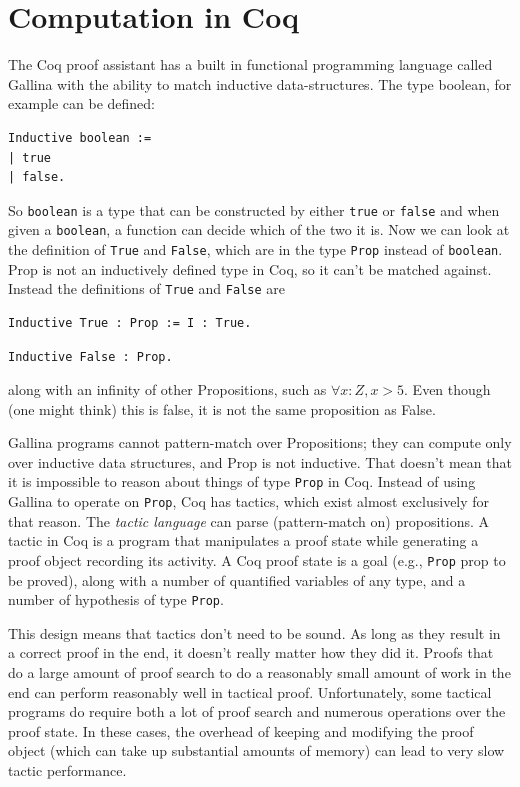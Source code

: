\documentclass{puthesis}
\begin{document}
\chapter{Computation in Coq}
\label{ch:computation}
The Coq proof assistant has a built in functional programming language
called Gallina with the ability to match inductive data-structures. The type
boolean, for example can be defined:

\begin{verbatim}
Inductive boolean :=
| true
| false.
\end{verbatim}

So \lstinline|boolean| is a type that can be constructed by either
\lstinline|true| or \lstinline|false| and when given a
\lstinline|boolean|, a function can decide which of the two it is. Now
we can look at the definition of \lstinline|True| and
\lstinline|False|, which are in the type
\lstinline|Prop| instead of \lstinline|boolean|. Prop is not an
inductively defined type in Coq, so it can't be matched
against. Instead the definitions of \lstinline|True| and \lstinline|False|
are

\begin{verbatim}
Inductive True : Prop := I : True.
\end{verbatim}
\begin{verbatim}
Inductive False : Prop.
\end{verbatim}

\noindent along with an infinity of other Propositions, such as
$\forall x:Z, x>5$.  Even though (one might think) this is false, it is not
the same proposition as False.

\noindent 
Gallina programs cannot pattern-match over Propositions; they can
compute only over inductive data structures, and Prop is not
inductive. That doesn't mean that it is impossible to reason about
things of type \lstinline|Prop| in Coq. Instead of using Gallina to
operate on \lstinline|Prop|, Coq has tactics, which exist almost
exclusively for that reason. The \emph{tactic language} can parse
(pattern-match on) propositions. A tactic in Coq is a program that
manipulates a proof state while generating a proof object recording
its activity. A Coq proof state is a goal (e.g., \lstinline|Prop| prop
to be proved), along with a number of quantified variables of any
type, and a number of hypothesis of type \lstinline|Prop|.

This design means that tactics don't need to be sound. As long as they
result in a correct proof in the end, it doesn't really matter how
they did it. Proofs that do a large amount of proof search to do a
reasonably small amount of work in the end can perform reasonably well
in tactical proof. Unfortunately, some tactical programs do require
both a lot of proof search and numerous operations over the proof
state. In these cases, the overhead of keeping and modifying the proof
object (which can take up substantial amounts of memory) can lead to
very slow tactic performance.
\end{document}
